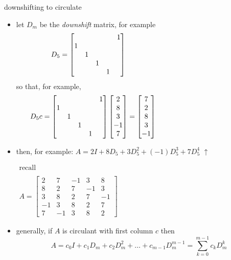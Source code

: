 \documentclass[10pt,
               svgnames,
               hyperref={colorlinks,citecolor=DeepPink4,linkcolor=FireBrick,urlcolor=Maroon},
               usepdftitle=false]{beamer}
\begin{document}
\begin{frame}{downshifting to circulate}

\begin{itemize}
\item let $D_m$ be the \emph{downshift} matrix, for example
{\small
	$$D_5 = \begin{bmatrix} & & & & 1 \\ 1 & & & & \\ & 1 & & & \\ & & 1 & & \\ & & & 1 & \end{bmatrix} \hspace{50mm}$$
}
so that, for example,
{\small
	$$D_5 c = \begin{bmatrix} & & & & 1 \\ 1 & & & & \\ & 1 & & & \\ & & 1 & & \\ & & & 1 & \end{bmatrix} \begin{bmatrix} 2 \\ 8 \\ 3 \\ -1 \\ 7 \end{bmatrix} = \begin{bmatrix} 7 \\ 2 \\ 8 \\ 3 \\ -1 \end{bmatrix} \hspace{45mm}$$
}
\item then, for example: \qquad $\displaystyle A = 2 I + 8 D_5 + 3 D_5^2 + (-1) D_5^3 + 7 D_5^4$ \hfill $\uparrow$

\vspace{-50mm}
{\scriptsize
\hfill $\displaystyle \boxed{\begin{matrix} \text{recall} \\ \\ A = \begin{bmatrix} 2 & 7 & -1 & 3 & 8 \\ 8 & 2 & 7 & -1 & 3 \\ 3 & 8 & 2 & 7 & -1 \\ -1 & 3 & 8 & 2 & 7 \\ 7 & -1 & 3 & 8 & 2 \end{bmatrix} \end{matrix}}$
}

\vspace{30mm}
\item generally, if $A$ is circulant with first column $c$ then
	$$A = c_0 I + c_1 D_m + c_2 D_m^2 + \dots + c_{m-1} D_m^{m-1} = \sum_{k=0}^{m-1} c_k D_m^k$$
\end{itemize}
\end{frame}
\end{document}
